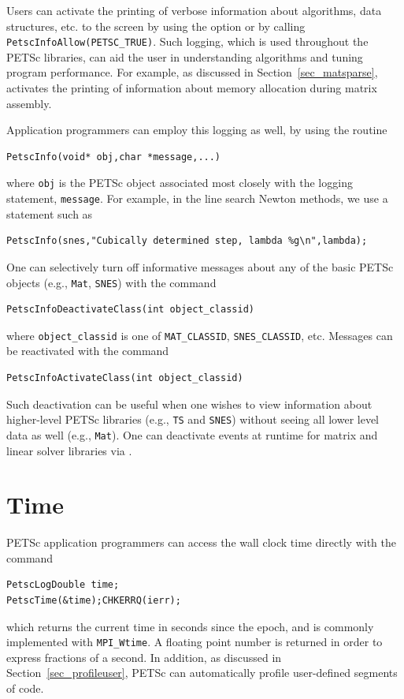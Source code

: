 {{Users can activate the printing of verbose information about
algorithms, data structures, etc. to the screen by using the option 
  or by calling \lstinline{PetscInfoAllow(PETSC_TRUE)}.
Such logging, which is used throughout the PETSc libraries,
can aid the user in understanding algorithms and
tuning program performance.  For example, as discussed in
Section~\ref{sec_matsparse},  activates the
printing of information about memory allocation during
matrix assembly.

Application programmers can employ this logging as well, by
using the routine
\begin{lstlisting}
PetscInfo(void* obj,char *message,...)
\end{lstlisting}
where \lstinline{obj} is the PETSc object associated most closely with
the logging statement, \lstinline{message}.
For example, in the line search Newton methods, we use a statement such as
\begin{lstlisting}
PetscInfo(snes,"Cubically determined step, lambda %g\n",lambda);
\end{lstlisting}

One can selectively turn off informative messages about any of the
basic PETSc objects (e.g., \lstinline{Mat}, \lstinline{SNES}) with the command
\begin{lstlisting}
PetscInfoDeactivateClass(int object_classid)
\end{lstlisting}
where
\lstinline{object_classid} is one of \lstinline{MAT_CLASSID}, \lstinline{SNES_CLASSID}, etc.
Messages can be reactivated with the command
\begin{lstlisting}
PetscInfoActivateClass(int object_classid)
\end{lstlisting}
Such deactivation can be useful when one wishes to view information
about higher-level PETSc libraries (e.g., \lstinline{TS} and \lstinline{SNES}) without
seeing all lower level data as well (e.g., \lstinline{Mat}).  One can deactivate
events at runtime for matrix and linear solver libraries via .

\section{Time}

PETSc application programmers can access the wall clock time directly
with the command 
\begin{lstlisting}
PetscLogDouble time;
PetscTime(&time);CHKERRQ(ierr);
\end{lstlisting}
which returns the current time in seconds since the epoch, and is commonly
implemented with \lstinline{MPI_Wtime}. A floating point number is returned in order
to express fractions of a second. In addition, as discussed in Section~\ref{sec_profileuser},
PETSc can automatically profile user-defined segments of code.

}}
